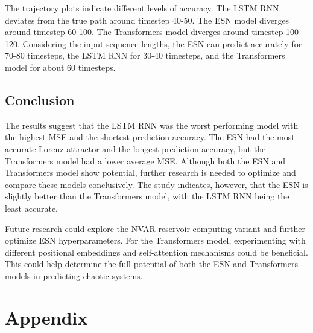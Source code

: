 \documentclass[11pt]{article}
\begin{document}
The trajectory plots indicate different levels of accuracy. The LSTM RNN deviates from the true path around timestep 40-50. The ESN model diverges around timestep 60-100. The Transformers model diverges around timestep 100-120. Considering the input sequence lengths, the ESN can predict accurately for 70-80 timesteps, the LSTM RNN for 30-40 timesteps, and the Transformers model for about 60 timesteps.

\subsection{Conclusion}
The results suggest that the LSTM RNN was the worst performing model with the highest MSE and the shortest prediction accuracy. The ESN had the most accurate Lorenz attractor and the longest prediction accuracy, but the Transformers model had a lower average MSE. Although both the ESN and Transformers model show potential, further research is needed to optimize and compare these models conclusively. The study indicates, however, that the ESN is slightly better than the Transformers model, with the LSTM RNN being the least accurate.

Future research could explore the NVAR reservoir computing variant and further optimize ESN hyperparameters. For the Transformers model, experimenting with different positional embeddings and self-attention mechanisms could be beneficial. This could help determine the full potential of both the ESN and Transformers models in predicting chaotic systems.




\appendix
\section*{Appendix}
\end{document}
